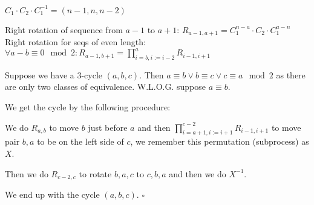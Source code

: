 \documentclass[11pt]{article}
\begin{document}
    $C_1 \cdot C_2 \cdot C_1^{-1} = (n-1, n, n-2)$

    Right rotation of sequence from $a-1$ to $a+1$: $R_{a-1,a+1} = C_1^{n-a} \cdot C_2 \cdot C_1^{a-n}$ \\
    Right rotation for seqs of even length: $\forall a-b \equiv 0 \mod 2: R_{a-1, b+1} = \prod\limits_{i = b, i:=i-2}^a R_{i-1,i+1}$

    Suppose we have a 3-cycle $(a, b, c)$. Then $a \equiv b \vee b \equiv c \vee c \equiv a \mod 2$ as there are only two classes of equivalence. W.L.O.G. suppose $a \equiv b$.

    We get the cycle by the following procedure:

    We do $R_{a,b}$ to move $b$ just before $a$ and then $\prod\limits_{i=a+1,i:=i+1}^{c-2} R_{i-1,i+1}$ to move pair $b,a$ to be on the left side of $c$, we remember this permutation (subprocess) as $X$.

    Then we do $R_{c-2,c}$ to rotate $b,a,c$ to $c,b,a$ and then we do $X^{-1}$.

    We end up with the cycle $(a,b,c)$. $\square$
\end{document}
